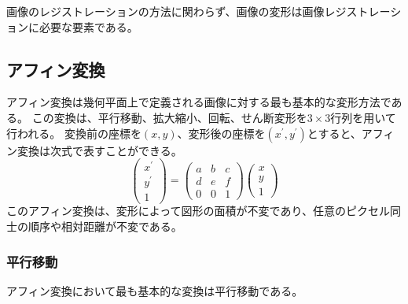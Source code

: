 画像のレジストレーションの方法に関わらず、画像の変形は画像レジストレーションに必要な要素である。


\subsection{アフィン変換}
    アフィン変換は幾何平面上で定義される画像に対する最も基本的な変形方法である。
    この変換は、平行移動、拡大縮小、回転、せん断変形を$3\times 3$行列を用いて行われる。
    変換前の座標を$(x,y)$、変形後の座標を$(x^{\prime},y^{\prime})$とすると、アフィン変換は次式で表すことができる。
    \begin{equation}
        \left(\begin{array}{l}
        x^{\prime} \\
        y^{\prime} \\
        1
        \end{array}\right)
        =
        \left(\begin{array}{lll}
        a & b & c\\
        d & e & f\\
        0 & 0 & 1
        \end{array}\right)
        \left(\begin{array}{l}
        x \\
        y \\
        1
        \end{array}\right)
    \end{equation}
    このアフィン変換は、変形によって図形の面積が不変であり、任意のピクセル同士の順序や相対距離が不変である。

    \subsubsection{平行移動}
        アフィン変換において最も基本的な変換は平行移動である。

